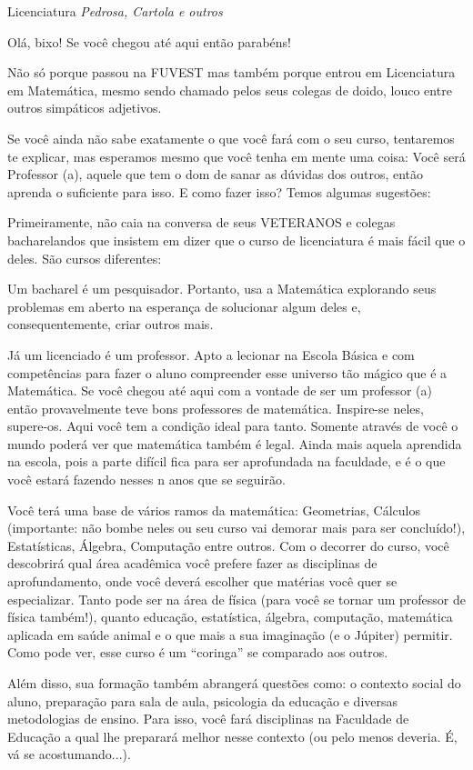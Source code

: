 \begin{subsecao}{Licenciatura}
{\em Pedrosa, Cartola e outros}

Olá, bixo! Se você chegou até aqui então parabéns!

Não só porque passou na FUVEST mas também porque entrou em Licenciatura em
Matemática, mesmo sendo chamado pelos seus colegas de doido, louco entre
outros simpáticos adjetivos.

Se você ainda não sabe exatamente o que você fará com o seu curso, tentaremos
te explicar, mas esperamos mesmo que você tenha em mente uma coisa: Você será
Professor (a), aquele que tem o dom de sanar as dúvidas dos outros, então
aprenda o suficiente para isso. E como fazer isso? Temos algumas sugestões:

Primeiramente, não caia na conversa de seus VETERANOS e colegas bacharelandos
que insistem em dizer que o curso de licenciatura é mais fácil que o deles. São
cursos diferentes:

Um bacharel é um pesquisador. Portanto, usa a Matemática explorando seus
problemas em aberto na esperança de solucionar algum deles e, consequentemente,
criar outros mais.

Já um licenciado é um professor. Apto a lecionar na Escola Básica e com
competências para fazer o aluno compreender esse universo tão mágico que é a
Matemática. Se você chegou até aqui com a vontade de ser um professor (a) então
provavelmente teve bons professores de matemática. Inspire-se neles, supere-os.
Aqui você tem a condição ideal para tanto. Somente através de você o mundo
poderá ver que matemática também é legal. Ainda mais aquela aprendida na
escola, pois a parte difícil fica para ser aprofundada na faculdade, e é o que
você estará fazendo nesses n anos que se seguirão.

Você terá uma base de vários ramos da matemática: Geometrias,
Cálculos (importante: não bombe neles ou seu curso vai demorar mais para ser
concluído!), Estatísticas, Álgebra, Computação entre outros. Com o decorrer do
curso, você descobrirá qual área acadêmica você prefere fazer as disciplinas de
aprofundamento, onde você deverá escolher que matérias você quer se
especializar. Tanto pode ser na área de física (para você se tornar um
professor de física também!), quanto educação, estatística, álgebra,
computação, matemática aplicada em saúde animal e o que mais a sua
imaginação (e o Júpiter) permitir. Como pode ver, esse curso é um “coringa” se
comparado aos outros.

Além disso, sua formação também abrangerá questões como: o contexto social do
aluno, preparação para sala de aula, psicologia da educação e diversas
metodologias de ensino. Para isso, você fará disciplinas na Faculdade de
Educação a qual lhe preparará melhor nesse contexto (ou pelo menos deveria. É,
vá se acostumando...).


\end{subsecao}
